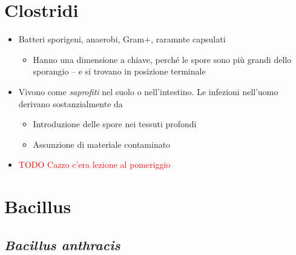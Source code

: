 \documentclass[italian,]{article}
\providecommand{\tightlist}{%
  \setlength{\itemsep}{0pt}\setlength{\parskip}{0pt}}
\newcommand{\TODO}[1]{\textcolor{red}{\textsf{\footnotesize{TODO #1}}}} %
\begin{document}
\hypertarget{clostridi}{%
\section{Clostridi}\label{clostridi}}

\begin{itemize}
\item
  Batteri sporigeni, anaerobi, Gram+, raramnte capsulati

  \begin{itemize}
  \tightlist
  \item
    Hanno una dimensione a chiave, perché le spore sono più grandi dello
    sporangio -- e si trovano in posizione terminale
  \end{itemize}
\item
  Vivono come \emph{saprofiti} nel suolo o nell'intestino. Le infezioni
  nell'uomo derivano sostanzialmente da

  \begin{itemize}
  \tightlist
  \item
    Introduzione delle spore nei tessuti profondi
  \item
    Assunzione di materiale contaminato
  \end{itemize}
\item
  \TODO{Cazzo c'era lezione al pomeriggio}
\end{itemize}

\hypertarget{bacillus}{%
\section{Bacillus}\label{bacillus}}

\hypertarget{bacillus-anthracis}{%
\subsection{\texorpdfstring{\emph{Bacillus
anthracis}}{Bacillus anthracis}}\label{bacillus-anthracis}}
\end{document}
